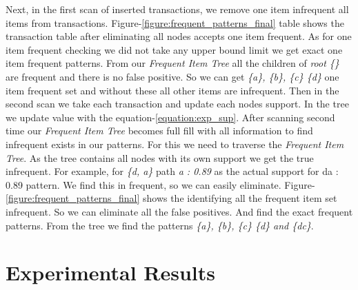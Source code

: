 \documentclass[conference]{IEEEtran}
\begin{document}
Next, in the first scan of inserted transactions, we remove one item infrequent all items from transactions. Figure-\ref{figure:frequent_patterns_final} table shows the transaction table after eliminating all nodes accepts one item frequent. As for one item frequent checking we did not take any upper bound limit we get exact one item frequent patterns. From our \emph{Frequent Item Tree} all the children of \emph{root \{\}} are frequent and there is no false positive. So we can get \emph{\{a\}, \{b\}, \{c\} \{d\}} one item frequent set and without these all other items are infrequent.  Then in the second scan we take each transaction and update each nodes support. In the tree we update value with the equation-\ref{equation:exp_sup}. After scanning second time our \emph{Frequent Item Tree} becomes full fill with all information to find infrequent exists in our patterns. For this we need to traverse the \emph{Frequent Item Tree}. As the tree contains all nodes with its own support we get the true infrequent. For example, for \emph{\{d, a\}} path \emph{a : 0.89} as the actual support for {da : 0.89} pattern. We find this in frequent, so we can easily eliminate. Figure-\ref{figure:frequent_patterns_final} shows the identifying all the frequent item set infrequent. So we can eliminate all the false positives.    And find the exact frequent patterns. From the tree we find the patterns \emph{\{a\}, \{b\}, \{c\} \{d\} and \{dc\}}.
    





\section{Experimental Results}
\end{document}
